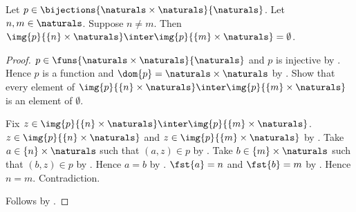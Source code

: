 \begin{proposition}\label{distinct_natural_pairing_rows_disjoint}
    Let $p\in\bijections{\naturals\times\naturals}{\naturals}$.
    Let $n,m\in\naturals$.
    Suppose $n\neq m$.
    Then $\img{p}{\{n\}\times\naturals}\inter
        \img{p}{\{m\}\times\naturals}=\emptyset$.
\end{proposition}
\begin{proof}
    $p\in\funs{\naturals\times\naturals}{\naturals}$ and
        $p$ is injective by .
    Hence $p$ is a function and
        $\dom{p}=\naturals\times\naturals$
        by .
    Show that every element of
        $\img{p}{\{n\}\times\naturals}\inter
            \img{p}{\{m\}\times\naturals}$
        is an element of $\emptyset$.
    \begin{subproof}
        Fix $z\in
            \img{p}{\{n\}\times\naturals}\inter
                \img{p}{\{m\}\times\naturals}$.
        $z\in\img{p}{\{n\}\times\naturals}$ and
            $z\in\img{p}{\{m\}\times\naturals}$ by .
        Take $a\in\{n\}\times\naturals$ such that $(a,z)\in p$
            by .
        Take $b\in\{m\}\times\naturals$ such that $(b,z)\in p$
            by .
        Hence $a=b$ by .
        $\fst{a}=n$ and $\fst{b}=m$
            by .
        Hence $n=m$.
        Contradiction.
    \end{subproof}
    Follows by .
\end{proof}

